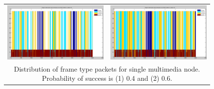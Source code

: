 \documentclass{llncs}
\begin{document}
\begin{figure}
\begin{center}
\begin{tabular}{cc}
\includegraphics[scale=0.2]{single_mm_pSucc04.png} & \includegraphics[scale=0.2]{single_mm_pSucc06.png} \\
\multicolumn{2}{c}{Distribution of frame type packets for single multimedia node. Probability of success is (1) 0.4 and (2) 0.6.}
\end{tabular}
\end{center}
\label{fig:single_node_mm1}
\end{figure}
\end{document}
